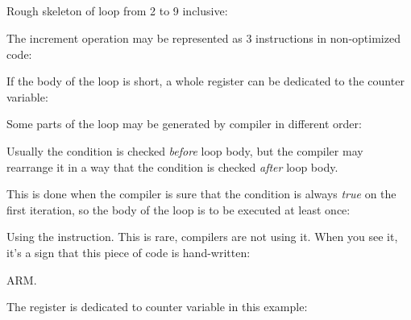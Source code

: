 ﻿%
\subsection{\Conclusion{}}

Rough skeleton of loop from 2 to 9 inclusive:



The increment operation may be represented as 3 instructions in non-optimized code:



If the body of the loop is short, a whole register can be dedicated to the counter variable:



Some parts of the loop may be generated by compiler in different order:



Usually the condition is checked \emph{before} loop body, but the compiler may rearrange it in a way that
the condition is checked \emph{after} loop body.

This is done when the compiler is sure that the condition is always \emph{true} on the first iteration, 
so the body of the loop is to be executed at least once:




Using the  instruction. This is rare, compilers are not using it.
When you see it, it's a sign that this piece of code is hand-written:



ARM. 

The  register is dedicated to counter variable in this example:




